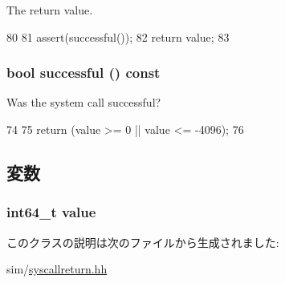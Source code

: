 The return value. 


\begin{DoxyCode}
80     {
81         assert(successful());
82         return value;
83     }
\end{DoxyCode}
\hypertarget{classSyscallReturn_a4a56e02db533279e0c23d6010779933e}{
\subsubsection[{successful}]{\setlength{\rightskip}{0pt plus 5cm}bool successful () const}}
\label{classSyscallReturn_a4a56e02db533279e0c23d6010779933e}


Was the system call successful? 


\begin{DoxyCode}
74     {
75         return (value >= 0 || value <= -4096);
76     }
\end{DoxyCode}


\subsection{変数}
\hypertarget{classSyscallReturn_ac072af30c4ffbc834bb4c681f6ecb514}{
\subsubsection[{value}]{\setlength{\rightskip}{0pt plus 5cm}int64\_\-t {\bf value}}}
\label{classSyscallReturn_ac072af30c4ffbc834bb4c681f6ecb514}


このクラスの説明は次のファイルから生成されました:\begin{DoxyCompactItemize}
\item 
sim/\hyperlink{syscallreturn_8hh}{syscallreturn.hh}\end{DoxyCompactItemize}
